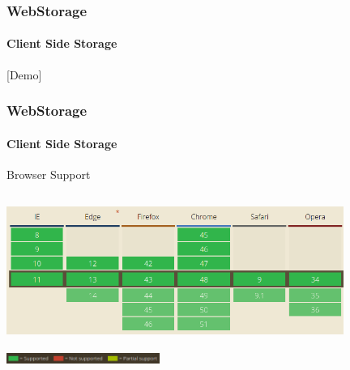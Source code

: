 \begin{frame}[fragile]
\frametitle{WebStorage}
\framesubtitle{Client Side Storage}
	\begin{center}
		\large [Demo]
	\end{center}
\end{frame}
\begin{frame}[fragile]
\frametitle{WebStorage}
\framesubtitle{Client Side Storage}
	Browser Support
	\begin{center}
		\includegraphics[height=5cm,width=11cm]{img/webStorage-support.png}
		\\
		\includegraphics[height=0.5cm,width=5cm]{img/legende.png}
	\end{center}
\end{frame}
